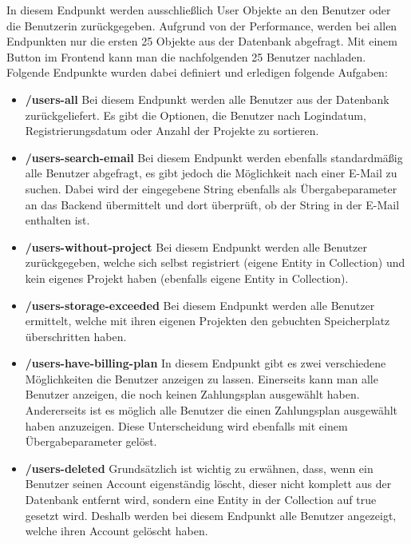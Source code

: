 In diesem Endpunkt werden ausschließlich User Objekte an den Benutzer oder die Benutzerin zurückgegeben. Aufgrund von der Performance, werden bei allen Endpunkten nur die ersten 25 Objekte aus der Datenbank abgefragt. Mit einem Button im Frontend kann man die nachfolgenden 25 Benutzer nachladen. Folgende Endpunkte wurden dabei definiert und erledigen folgende Aufgaben:
\begin{itemize}
    \item \textbf{/users-all}
        \newline
        Bei diesem Endpunkt werden alle Benutzer aus der Datenbank zurückgeliefert. Es gibt die Optionen, die Benutzer nach Logindatum, Registrierungsdatum oder Anzahl der Projekte zu sortieren.
        \newpage
    \item \textbf{/users-search-email}
        \newline
        Bei diesem Endpunkt werden ebenfalls standardmäßig alle Benutzer abgefragt, es gibt jedoch die Möglichkeit nach einer E-Mail zu suchen. Dabei wird der eingegebene String ebenfalls als Übergabeparameter an das Backend übermittelt und dort überprüft, ob der String in der E-Mail enthalten ist.
    \item \textbf{/users-without-project}
        \newline
        Bei diesem Endpunkt werden alle Benutzer zurückgegeben, welche sich selbst registriert (eigene Entity in Collection) und kein eigenes Projekt haben (ebenfalls eigene Entity in Collection).
    \item \textbf{/users-storage-exceeded}
        \newline
        Bei diesem Endpunkt werden alle Benutzer ermittelt, welche mit ihren eigenen Projekten den gebuchten Speicherplatz überschritten haben.
    \item \textbf{/users-have-billing-plan}
        \newline
        In diesem Endpunkt gibt es zwei verschiedene Möglichkeiten die Benutzer anzeigen zu lassen. Einerseits kann man alle Benutzer anzeigen, die noch keinen Zahlungsplan ausgewählt haben. Andererseits ist es möglich alle Benutzer die einen Zahlungsplan ausgewählt haben anzuzeigen. Diese Unterscheidung wird ebenfalls mit einem Übergabeparameter gelöst.
    \item \textbf{/users-deleted}
        \newline
        Grundsätzlich ist wichtig zu erwähnen, dass, wenn ein Benutzer seinen Account eigenständig löscht, dieser nicht komplett aus der Datenbank entfernt wird, sondern eine Entity in der Collection auf true gesetzt wird. Deshalb werden bei diesem Endpunkt alle Benutzer angezeigt, welche ihren Account gelöscht haben.

\end{itemize}
